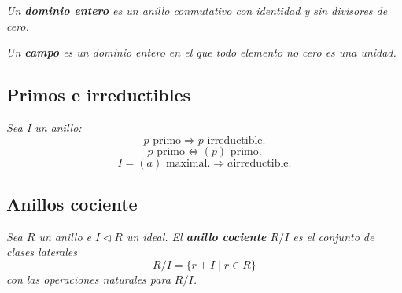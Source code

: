 \documentclass[11pt,letterpaper]{article}
\begin{document}
\begin{tcolorbox}[colback=CINVESTAV!10, colframe=CINVESTAV, title=\textcolor{white}{Dominio entero}]
\textit{
Un \textbf{dominio entero} es un anillo conmutativo con identidad y sin divisores de cero.
}
\end{tcolorbox}

\begin{tcolorbox}[colback=CINVESTAV!10, colframe=CINVESTAV, title=\textcolor{white}{Campo}]
\textit{
Un \textbf{campo} es un dominio entero en el que todo elemento no cero es una unidad.
}
\end{tcolorbox}

\subsection{Primos e irreductibles}


\begin{tcolorbox}[colback=CINVESTAV!10, colframe=CINVESTAV, title=\textcolor{white}{Implicaciones b\'asicas}]
\textit{
Sea I un anillo:
\[
p \text{ primo} \Longrightarrow p \text{ irreductible.}
\]
\[
p \text{ primo} \iff (p) \text{ primo.}
\]
\[
I = (a) \text{ maximal.} \Longrightarrow a \text{irreductible.}
\]
}
\end{tcolorbox}

\subsection{Anillos cociente}

\begin{tcolorbox}[colback=CINVESTAV!10, colframe=CINVESTAV, title=\textcolor{white}{Anillo cociente}]
\textit{
Sea $R$ un anillo e $I \triangleleft R$ un ideal. El \textbf{anillo cociente} $R/I$ es el conjunto de clases laterales
\[
R/I = \{ r+I \mid r \in R \}
\]
con las operaciones naturales para $R/I$.
}
\end{tcolorbox}
\end{document}
